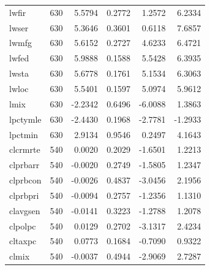 \documentclass{article}
\begin{document}
\begin{longtable}{p{} r r r r r}
lwfir & 630 & 5.5794 & 0.2772 & 1.2572 & 6.2334 \\
lwser & 630 & 5.3646 & 0.3601 & 0.6118 & 7.6857 \\
lwmfg & 630 & 5.6152 & 0.2727 & 4.6233 & 6.4721 \\
lwfed & 630 & 5.9888 & 0.1588 & 5.5428 & 6.3935 \\
lwsta & 630 & 5.6778 & 0.1761 & 5.1534 & 6.3063 \\
lwloc & 630 & 5.5401 & 0.1597 & 5.0974 & 5.9612 \\
lmix & 630 & -2.2342 & 0.6496 & -6.0088 & 1.3863 \\
lpctymle & 630 & -2.4430 & 0.1968 & -2.7781 & -1.2933 \\
lpctmin & 630 & 2.9134 & 0.9546 & 0.2497 & 4.1643 \\
clcrmrte & 540 & 0.0020 & 0.2029 & -1.6501 & 1.2213 \\
clprbarr & 540 & -0.0020 & 0.2749 & -1.5805 & 1.2347 \\
clprbcon & 540 & -0.0026 & 0.4837 & -3.0456 & 2.1956 \\
clprbpri & 540 & -0.0094 & 0.2757 & -1.2356 & 1.1310 \\
clavgsen & 540 & -0.0141 & 0.3223 & -1.2788 & 1.2078 \\
clpolpc & 540 & 0.0129 & 0.2702 & -3.1317 & 2.4234 \\
cltaxpc & 540 & 0.0773 & 0.1684 & -0.7090 & 0.9322 \\
clmix & 540 & -0.0037 & 0.4944 & -2.9069 & 2.7287 \\
\bottomrule
\end{longtable}
\end{document}
